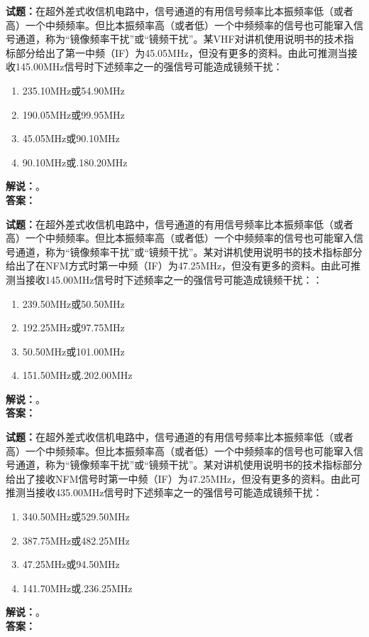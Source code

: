 \documentclass{ctexbook}
\begin{document}
\bigskip

\noindent\textbf{试题：}在超外差式收信机电路中，信号通道的有用信号频率比本振频率低（或者高）一个中频频率。但比本振频率高（或者低）一个中频频率的信号也可能窜入信号通道，称为“镜像频率干扰”或“镜频干扰”。某VHF对讲机使用说明书的技术指标部分给出了第一中频（IF）为45.05\unit{\MHz}，但没有更多的资料。由此可推测当接收145.00\unit{\MHz}信号时下述频率之一的强信号可能造成镜频干扰：
\begin{enumerate}[leftmargin=3em]
  \item 235.10\unit{\MHz}或54.90\unit{\MHz}
  \item 190.05\unit{\MHz}或99.95\unit{\MHz}
  \item 45.05\unit{\MHz}或90.10\unit{\MHz}
  \item 90.10\unit{\MHz}或.180.20\unit{\MHz}
\end{enumerate}
\noindent\textbf{解说：}\textbf{}。\\\noindent\textbf{答案：}

\bigskip

\noindent\textbf{试题：}在超外差式收信机电路中，信号通道的有用信号频率比本振频率低（或者高）一个中频频率。但比本振频率高（或者低）一个中频频率的信号也可能窜入信号通道，称为“镜像频率干扰”或“镜频干扰”。某对讲机使用说明书的技术指标部分给出了在NFM方式时第一中频（IF）为47.25\unit{\MHz}，但没有更多的资料。由此可推测当接收145.00\unit{\MHz}信号时下述频率之一的强信号可能造成镜频干扰：：
\begin{enumerate}[leftmargin=3em]
  \item 239.50\unit{\MHz}或50.50\unit{\MHz}
  \item 192.25\unit{\MHz}或97.75\unit{\MHz}
  \item 50.50\unit{\MHz}或101.00\unit{\MHz}
  \item 151.50\unit{\MHz}或.202.00\unit{\MHz}
\end{enumerate}
\noindent\textbf{解说：}\textbf{}。\\\noindent\textbf{答案：}

\bigskip

\noindent\textbf{试题：}在超外差式收信机电路中，信号通道的有用信号频率比本振频率低（或者高）一个中频频率。但比本振频率高（或者低）一个中频频率的信号也可能窜入信号通道，称为“镜像频率干扰”或“镜频干扰”。某对讲机使用说明书的技术指标部分给出了接收NFM信号时第一中频（IF）为47.25\unit{\MHz}，但没有更多的资料。由此可推测当接收435.00\unit{\MHz}信号时下述频率之一的强信号可能造成镜频干扰：
\begin{enumerate}[leftmargin=3em]
  \item 340.50\unit{\MHz}或529.50\unit{\MHz}
  \item 387.75\unit{\MHz}或482.25\unit{\MHz}
  \item 47.25\unit{\MHz}或94.50\unit{\MHz}
  \item 141.70\unit{\MHz}或.236.25\unit{\MHz}
\end{enumerate}
\noindent\textbf{解说：}\textbf{}。\\\noindent\textbf{答案：}
\end{document}
